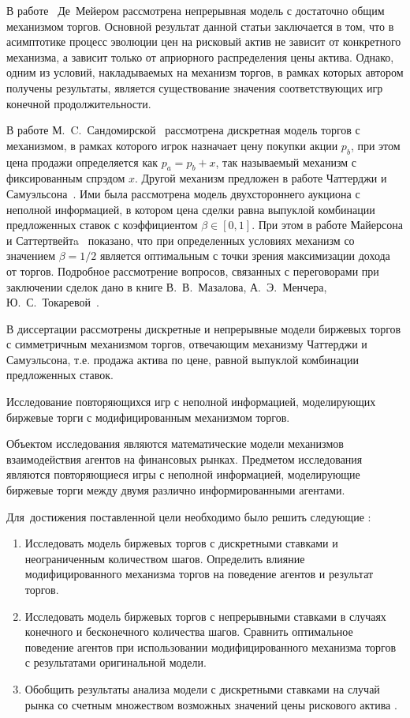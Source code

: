 В работе~\cite{demeyer10} Де~Мейером рассмотрена непрерывная модель с достаточно общим механизмом торгов.
Основной результат данной статьи заключается в том, что в асимптотике процесс эволюции цен на рисковый актив не зависит от конкретного механизма, а зависит только от априорного распределения цены актива.
Однако, одним из условий, накладываемых на механизм торгов, в рамках которых автором получены результаты, является существование значения соответствующих игр конечной продолжительности.

В работе М.~C.~Сандомирской~\cite{sandomirskaya14} рассмотрена дискретная модель торгов с механизмом, в рамках которого игрок назначает цену покупки акции $p_b$, при этом цена продажи определяется как $p_a = p_b + x$, так называемый механизм с фиксированным спрэдом $x$.
Другой механизм предложен в работе Чаттерджи и Самуэльсона~\cite{chatterjee83}.
Ими была рассмотрена модель двухстороннего аукциона с неполной информацией, в котором цена сделки равна выпуклой комбинации предложенных ставок с коэффициентом $\beta \in [0, 1]$.
При этом в работе Майерсона и Саттертвейтa~\cite{myerson83} показано, что при определенных условиях механизм со значением $\beta = 1/2$ является оптимальным с точки зрения максимизации дохода от торгов.
Подробное рассмотрение вопросов, связанных с переговорами при заключении сделок дано в книге В.~В.~Мазалова, А.~Э.~Менчера, Ю.~С.~Токаревой~\cite{mazalov12}.

{\progress} 
В диссертации рассмотрены дискретные и непрерывные модели биржевых торгов с симметричным механизмом торгов, отвечающим механизму Чаттерджи и Самуэльсона, т.е. продажа актива по цене, равной выпуклой комбинации предложенных ставок.

{\aim} Исследование повторяющихся игр с неполной информацией, моделирующих биржевые торги с модифицированным механизмом торгов.

{\researchsubject} Объектом исследования являются математические модели механизмов взаимодействия агентов на финансовых рынках.
Предметом исследования являются повторяющиеся игры с неполной информацией, моделирующие биржевые торги между двумя различно информированными агентами.

Для~достижения поставленной цели необходимо было решить следующие {\tasks}:
\begin{enumerate}
\item 
Исследовать модель биржевых торгов с дискретными ставками и неограниченным количеством шагов.
Определить влияние модифицированного механизма торгов на поведение агентов и результат торгов.
\item 
Исследовать модель биржевых торгов с непрерывными ставками в случаях конечного и бесконечного количества шагов.
Сравнить оптимальное поведение агентов при использовании модифицированного механизма торгов с результатами оригинальной модели.
\item 
Обобщить результаты анализа модели с дискретными ставками на случай рынка со счетным множеством возможных значений цены рискового актива .
\end{enumerate}

